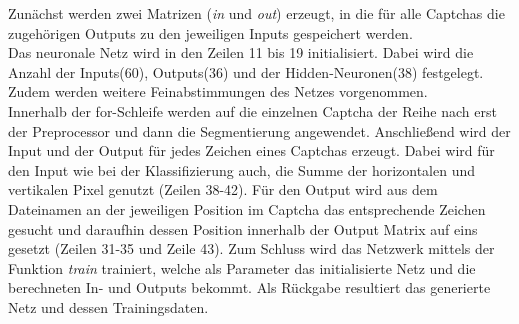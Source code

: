 Zunächst werden zwei Matrizen (\textit{in} und \textit{out}) erzeugt, in die für alle Captchas die zugehörigen Outputs zu den jeweiligen Inputs gespeichert werden.\\
Das neuronale Netz wird in den Zeilen 11 bis 19 initialisiert. Dabei wird die Anzahl der Inputs(60), Outputs(36) und der Hidden-Neuronen(38) festgelegt. Zudem werden weitere Feinabstimmungen des Netzes vorgenommen.\\
Innerhalb der for-Schleife werden auf die einzelnen Captcha der Reihe nach erst der Preprocessor und dann die Segmentierung angewendet. Anschließend wird der Input und der Output für jedes Zeichen eines Captchas erzeugt. Dabei wird für den Input wie bei der Klassifizierung auch, die Summe der horizontalen und vertikalen Pixel genutzt (Zeilen 38-42). Für den Output wird aus dem Dateinamen an der jeweiligen Position im Captcha das entsprechende Zeichen gesucht und daraufhin dessen Position innerhalb der Output Matrix auf eins gesetzt (Zeilen 31-35 und Zeile 43). Zum Schluss wird das Netzwerk mittels der Funktion \textit{train} trainiert, welche als Parameter das initialisierte Netz und die berechneten In- und Outputs bekommt. Als Rückgabe resultiert das generierte Netz und dessen Trainingsdaten.

\newpage
